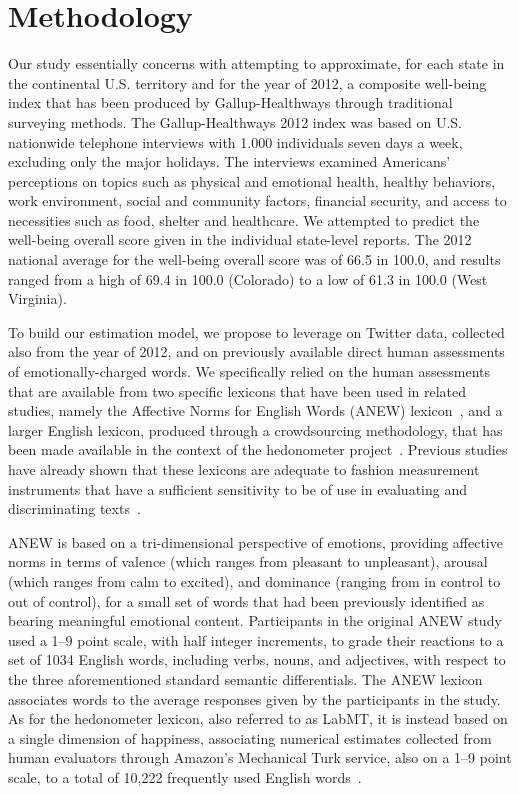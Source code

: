 \documentclass{acm_proc_article-sp}
\begin{document}
\section{Methodology}

Our study essentially concerns with attempting to approximate, for each state in the continental U.S. territory and for the year of 2012, a composite well-being index that has been produced by Gallup-Healthways through traditional surveying methods. The Gallup-Healthways 2012 index was based on U.S. nationwide telephone interviews with 1.000 individuals seven days a week, excluding only the major holidays. The interviews examined Americans’ perceptions on topics such as physical and emotional health, healthy behaviors, work environment, social and community factors, financial security, and access to necessities such as food, shelter and healthcare. We attempted to predict the well-being overall score given in the individual state-level reports. The 2012 national average for the well-being overall score was of 66.5 in 100.0, and results ranged from a high of 69.4 in 100.0 (Colorado) to a low of 61.3 in 100.0 (West Virginia).

To build our estimation model, we propose to leverage on Twitter data, collected also from the year of 2012, and on previously available direct human assessments of emotionally-charged words. We specifically relied on the human assessments that are available from two specific lexicons that have been used in related studies, namely the Affective Norms for English Words (ANEW) lexicon~\cite{Bradley1999ANEW}, and a larger English lexicon, produced through a crowdsourcing methodology, that has been made available in the context of the hedonometer project~\cite{Dodds:2011:Tweets}. Previous studies have already shown that these lexicons are adequate to fashion measurement instruments that have a sufficient sensitivity to be of use in evaluating and discriminating texts~\cite{Dodds:2010:Lyrics,Dodds:2011:Tweets}.

ANEW is based on a tri-dimensional perspective of emotions, providing affective norms in terms of valence (which ranges from pleasant to unpleasant), arousal (which ranges from calm to excited), and dominance (ranging from in control to out of control), for a small set of words that had been previously identified as bearing meaningful emotional content. Participants in the original ANEW study used a 1–9 point scale, with half integer increments, to grade their reactions to a set of 1034 English words, including verbs, nouns, and adjectives, with respect to the three aforementioned standard semantic differentials. The ANEW lexicon associates words to the average responses given by the participants in the study. As for the hedonometer lexicon, also referred to as LabMT, it is instead based on a single dimension of happiness, associating numerical estimates collected from human evaluators through Amazon’s Mechanical Turk service, also on a 1–9 point scale, to a total of 10,222 frequently used English words~\cite{Dodds:2011:Tweets}.
\end{document}
